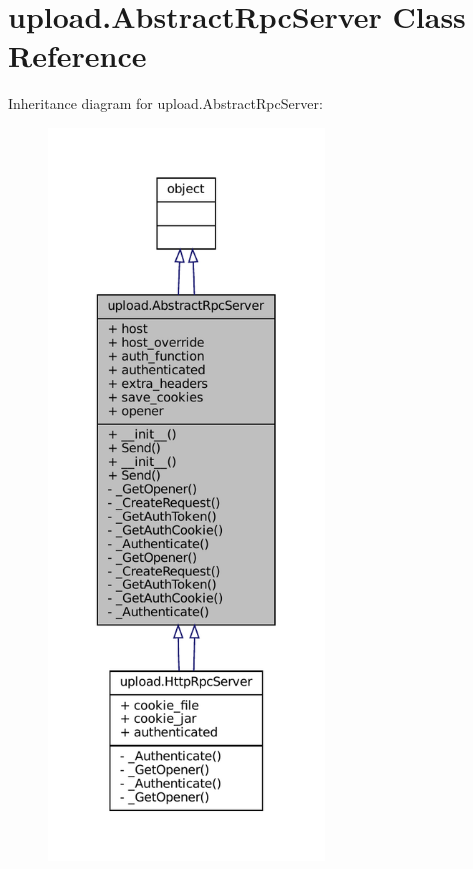 \hypertarget{classupload_1_1AbstractRpcServer}{}\section{upload.\+Abstract\+Rpc\+Server Class Reference}
\label{classupload_1_1AbstractRpcServer}


Inheritance diagram for upload.\+Abstract\+Rpc\+Server\+:
\nopagebreak
\begin{figure}[H]
\begin{center}
\leavevmode
\includegraphics[height=550pt]{classupload_1_1AbstractRpcServer__inherit__graph}
\end{center}
\end{figure}


